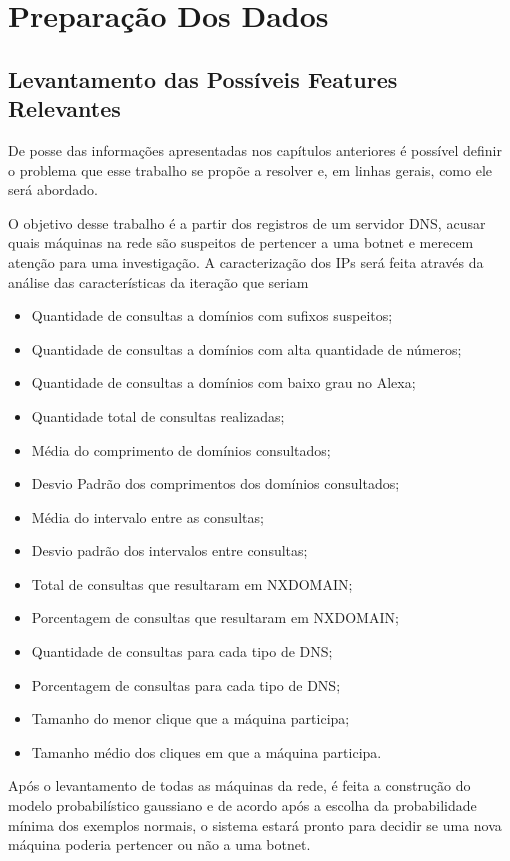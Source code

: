 \chapter{Preparação Dos Dados}

\section{Levantamento das Possíveis Features Relevantes}
De posse das informações apresentadas nos capítulos anteriores é possível definir o problema que esse trabalho se propõe a resolver e, em linhas gerais, como ele será abordado.

O objetivo desse trabalho é a partir dos registros de um servidor DNS, acusar quais máquinas na rede são suspeitos de pertencer a uma botnet e merecem atenção para uma investigação. A caracterização dos IPs será feita através da análise das características da iteração que seriam

\begin{itemize}
\item Quantidade de consultas a domínios com sufixos suspeitos;
\item Quantidade de consultas a domínios com alta quantidade de números;
\item Quantidade de consultas a domínios com baixo grau no Alexa;
\item Quantidade total de consultas realizadas;
\item Média do comprimento de domínios consultados;
\item Desvio Padrão dos comprimentos dos domínios consultados;
\item Média do intervalo entre as consultas;
\item Desvio padrão dos intervalos entre consultas;
\item Total de consultas que resultaram em NXDOMAIN;
\item Porcentagem de consultas que resultaram em NXDOMAIN;
\item Quantidade de consultas para cada tipo de DNS;
\item Porcentagem de consultas para cada tipo de DNS;
\item Tamanho do menor clique que a máquina participa;
\item Tamanho médio dos cliques em que a máquina participa.
\end{itemize}

Após o levantamento de todas as máquinas da rede, é feita a construção do modelo probabilístico gaussiano e de acordo após a escolha da probabilidade mínima dos exemplos normais, o sistema estará pronto para decidir se uma nova máquina poderia pertencer ou não a uma botnet.
